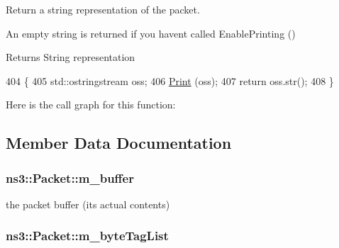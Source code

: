 Return a string representation of the packet. 

An empty string is returned if you haven\textquotesingle{}t called Enable\+Printing ()

\begin{DoxyReturn}{Returns}
String representation 
\end{DoxyReturn}

\begin{DoxyCode}
404 \{
405   std::ostringstream oss;
406   \hyperlink{classns3_1_1Packet_aa34058a5cdbf94673531f8c4001ab227}{Print} (oss);
407   \textcolor{keywordflow}{return} oss.str();
408 \}
\end{DoxyCode}


Here is the call graph for this function\+:




\subsection{Member Data Documentation}
\subsubsection[{\texorpdfstring{m\+\_\+buffer}{m_buffer}}]{ ns3\+::\+Packet\+::m\+\_\+buffer\hspace{0.3cm}{\ttfamily [private]}}\hypertarget{classns3_1_1Packet_a0f17bc9b4177865c9fe48fc927d57996}{}\label{classns3_1_1Packet_a0f17bc9b4177865c9fe48fc927d57996}


the packet buffer (it\textquotesingle{}s actual contents) 

\subsubsection[{\texorpdfstring{m\+\_\+byte\+Tag\+List}{m_byteTagList}}]{ ns3\+::\+Packet\+::m\+\_\+byte\+Tag\+List\hspace{0.3cm}{\ttfamily [private]}}\hypertarget{classns3_1_1Packet_a29e08c3cc4220a80366eea801c00e4ba}{}\label{classns3_1_1Packet_a29e08c3cc4220a80366eea801c00e4ba}


